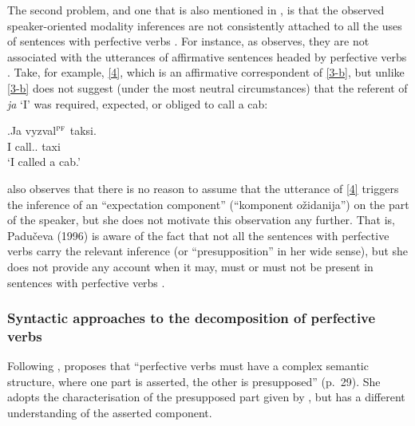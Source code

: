 The second problem, and one that is also mentioned in \citealt{Gronn:04}, is that the observed speaker-oriented modality inferences are not consistently attached to all the uses of sentences with perfective verbs . For instance, as \citet{Gronn:04} observes, they are not associated with the utterances of affirmative sentences headed by perfective verbs . Take, for example, \ref{4}, which is an affirmative correspondent of \ref{3-b}, but unlike \ref{3-b} does not suggest (under the most neutral circumstances) that the referent of \textit{ja} `I' was required, expected, or obliged to call a cab:

\exg.\label{4}Ja vyzval$^{\textsc{pf}}$ taksi.\\
 I call.. taxi\\
 \trans `I called a cab.'
 
\citet[56]{Paducheva:96} also observes that there is no reason to assume that the utterance of \ref{4} triggers the inference of an ``expectation component'' (``komponent o\v{z}idanija'') on the part of the speaker, but she does not motivate this observation any further. That is, Padu\v{c}eva (1996) is aware of the fact that not all the sentences with perfective verbs  carry the relevant inference (or ``presupposition'' in her wide sense), but she does not provide any account when it may, must or must not be present in sentences with perfective verbs . 
 
\subsubsection{Syntactic approaches to the decomposition of perfective verbs }
Following \citet{Paducheva:96}, \citet{Romanova:06} proposes that ``perfective verbs  must have a complex semantic structure, where one part is asserted, the other is presupposed'' (p.~29). She adopts the characterisation of the presupposed part given by \citet{Paducheva:96}, but has a different understanding of the asserted component. 

